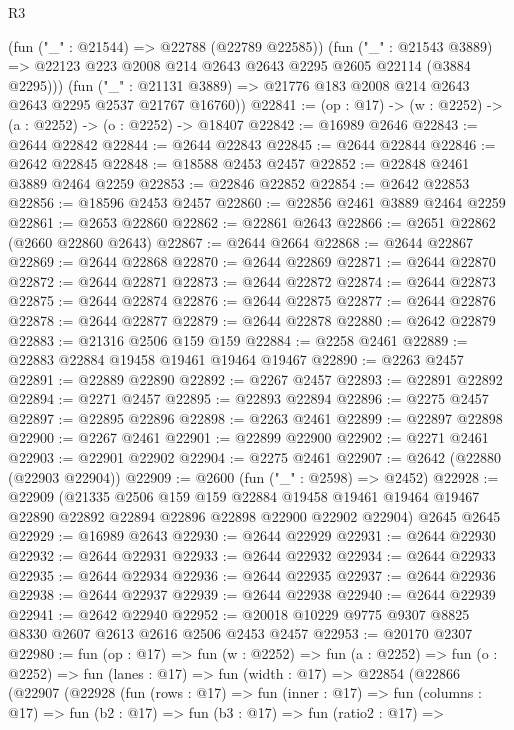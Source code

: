 \begin{lexlean}{R3}
\begin{coremodule}
        (fun ("_" : @21544) => @22788 (@22789 @22585))
        (fun ("_" : @21543 @3889) =>
        @22123 @223 @2008 @214 @2643 @2643 @2295 @2605 @22114 (@3884 @2295)))
      (fun ("_" : @21131 @3889) => @21776 @183 @2008 @214 @2643 @2643 @2295 @2537 @21767 @16760))
@22841 := (op : @17) -> (w : @2252) -> (a : @2252) -> (o : @2252) -> @18407
@22842 := @16989 @2646
@22843 := @2644 @22842
@22844 := @2644 @22843
@22845 := @2644 @22844
@22846 := @2642 @22845
@22848 := @18588 @2453 @2457
@22852 := @22848 @2461 @3889 @2464 @2259
@22853 := @22846 @22852
@22854 := @2642 @22853
@22856 := @18596 @2453 @2457
@22860 := @22856 @2461 @3889 @2464 @2259
@22861 := @2653 @22860
@22862 := @22861 @2643
@22866 := @2651 @22862 (@2660 @22860 @2643)
@22867 := @2644 @2664
@22868 := @2644 @22867
@22869 := @2644 @22868
@22870 := @2644 @22869
@22871 := @2644 @22870
@22872 := @2644 @22871
@22873 := @2644 @22872
@22874 := @2644 @22873
@22875 := @2644 @22874
@22876 := @2644 @22875
@22877 := @2644 @22876
@22878 := @2644 @22877
@22879 := @2644 @22878
@22880 := @2642 @22879
@22883 := @21316 @2506 @159 @159
@22884 := @2258 @2461
@22889 := @22883 @22884 @19458 @19461 @19464 @19467
@22890 := @2263 @2457
@22891 := @22889 @22890
@22892 := @2267 @2457
@22893 := @22891 @22892
@22894 := @2271 @2457
@22895 := @22893 @22894
@22896 := @2275 @2457
@22897 := @22895 @22896
@22898 := @2263 @2461
@22899 := @22897 @22898
@22900 := @2267 @2461
@22901 := @22899 @22900
@22902 := @2271 @2461
@22903 := @22901 @22902
@22904 := @2275 @2461
@22907 := @2642 (@22880 (@22903 @22904))
@22909 := @2600 (fun ("_" : @2598) => @2452)
@22928 := @22909
    (@21335
      @2506
      @159
      @159
      @22884
      @19458
      @19461
      @19464
      @19467
      @22890
      @22892
      @22894
      @22896
      @22898
      @22900
      @22902
      @22904)
    @2645
    @2645
@22929 := @16989 @2643
@22930 := @2644 @22929
@22931 := @2644 @22930
@22932 := @2644 @22931
@22933 := @2644 @22932
@22934 := @2644 @22933
@22935 := @2644 @22934
@22936 := @2644 @22935
@22937 := @2644 @22936
@22938 := @2644 @22937
@22939 := @2644 @22938
@22940 := @2644 @22939
@22941 := @2642 @22940
@22952 := @20018 @10229 @9775 @9307 @8825 @8330 @2607 @2613 @2616 @2506 @2453 @2457
@22953 := @20170 @2307
@22980 := fun (op : @17) =>
  fun (w : @2252) =>
  fun (a : @2252) =>
  fun (o : @2252) =>
  fun (lanes : @17) =>
  fun (width : @17) =>
  @22854
    (@22866
      (@22907
        (@22928
          (fun (rows : @17) =>
          fun (inner : @17) =>
          fun (columns : @17) =>
          fun (b2 : @17) =>
          fun (b3 : @17) =>
          fun (ratio2 : @17) =>

\end{coremodule}
\end{lexlean}
